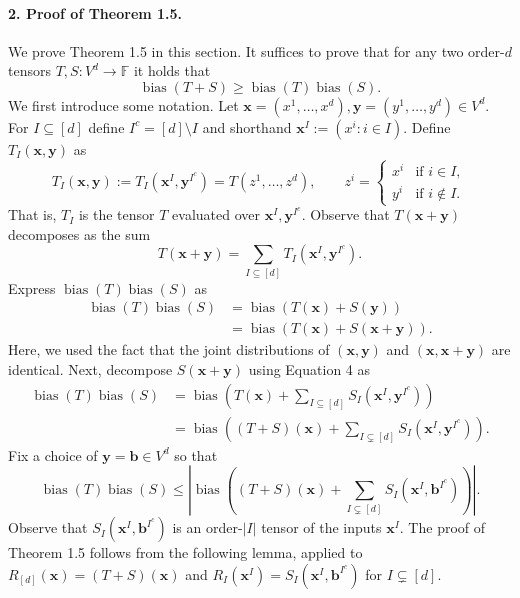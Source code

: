 \documentclass[UTF8,11pt]{ctexart}
\theoremstyle{definition}
\begin{document}
\paragraph{2. Proof of Theorem 1.5.}
We prove Theorem 1.5 in this section. It suffices to prove that for any two order-$d$ tensors $T,S:V^d\to\mathbb F$ it holds that
\[
\operatorname{bias}(T+S)\geq\operatorname{bias}(T)\operatorname{bias}(S). \tag{3}
\]
We first introduce some notation. Let $\mathbf x=(x^1,\ldots,x^d),\mathbf y=(y^1,\ldots,y^d)\in V^d$. For $I\subseteq[d]$ define $I^c=[d]\setminus I$ and shorthand $\mathbf x^I:=(x^i:i\in I)$. Define $T_I(\mathbf x,\mathbf y)$ as
\[
T_I(\mathbf x,\mathbf y):=T_I(\mathbf x^I,\mathbf y^{I^c})=T(z^1,\ldots,z^d),\qquad
z^i=\begin{cases}x^i&\text{if }i\in I,\\y^i&\text{if }i\notin I.\end{cases}
\]
That is, $T_I$ is the tensor $T$ evaluated over $\mathbf x^I,\mathbf y^{I^c}$. Observe that $T(\mathbf x+\mathbf y)$ decomposes as the sum
\[
T(\mathbf x+\mathbf y)=\sum_{I\subseteq[d]}T_I(\mathbf x^I,\mathbf y^{I^c}). \tag{4}
\]
Express $\operatorname{bias}(T)\operatorname{bias}(S)$ as
\begin{align*}
\operatorname{bias}(T)\operatorname{bias}(S)
&=\operatorname{bias}(T(\mathbf x)+S(\mathbf y))\\
&=\operatorname{bias}(T(\mathbf x)+S(\mathbf x+\mathbf y)).
\end{align*}
Here, we used the fact that the joint distributions of $(\mathbf x,\mathbf y)$ and $(\mathbf x,\mathbf x+\mathbf y)$ are identical. Next, decompose $S(\mathbf x+\mathbf y)$ using Equation 4 as
\begin{align*}
\operatorname{bias}(T)\operatorname{bias}(S)
&=\operatorname{bias}\left(T(\mathbf x)+\sum_{I\subseteq[d]}S_I(\mathbf x^I,\mathbf y^{I^c})\right)\\
&=\operatorname{bias}\left((T+S)(\mathbf x)+\sum_{I\subsetneq[d]}S_I(\mathbf x^I,\mathbf y^{I^c})\right).
\end{align*}
Fix a choice of $\mathbf y=\mathbf b\in V^d$ so that
\[
\operatorname{bias}(T)\operatorname{bias}(S)\leq
\left|\operatorname{bias}\left((T+S)(\mathbf x)+\sum_{I\subsetneq[d]}S_I(\mathbf x^I,\mathbf b^{I^c})\right)\right|.
\]
Observe that $S_I(\mathbf x^I,\mathbf b^{I^c})$ is an order-$|I|$ tensor of the inputs $\mathbf x^I$. The proof of Theorem 1.5 follows from the following lemma, applied to $R_{[d]}(\mathbf x)=(T+S)(\mathbf x)$ and $R_I(\mathbf x^I)=S_I(\mathbf x^I,\mathbf b^{I^c})$ for $I\subsetneq[d]$.
\end{document}
